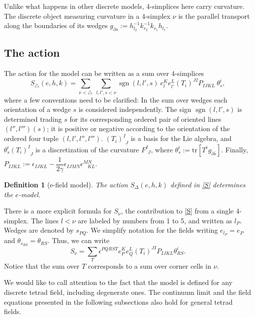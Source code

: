 \documentclass{article}
\newtheorem{definition}{Definition}
\DeclareMathOperator{\sgn}{sgn}
\begin{document}
	Unlike what happens in other discrete models, 4-simplices here carry curvature. The discrete object measuring curvature in a 4-simplex $\nu$ is the parallel transport along the boundaries of its wedges $g_{\partial s}:=h_{l_2}^{-1}k_{r_{2}}^{-1}k_{r_1}h_{l_1}$. 



\subsection{The action}%
\label{action}

The action for the model can be written as a sum over 4-simplices 
\begin{equation}\label{S}
	S_{\triangle}(e,h,k)=
	\sum_{\nu<\triangle} \ \sum_{l, l', s<\nu}
	\sgn(l,l',s) \ e_{l}^{K}e_{l'}^{L}\left(T_{i}\right)^{JI}P_{IJKL} \ \theta_{s}^{i},
\end{equation}	
where a few conventions need to be clarified: 
In the sum over wedges each orientation of a wedge $s$ is considered independently. 
The sign $\sgn(l,l',s)$ is 
determined trading $s$ for its corresponding ordered pair of oriented lines $(l'',l''')(s)$; 
it is positive or negative according to the orientation of the ordered four tuple $(l, l', l'',l''')$.  
$\left(T_{i}\right)_{~~J}^{I}$ is a basis for the Lie algebra, and 
$\theta_{s}^{i} \left(T_{i}\right)_{~~J}^{I}$ is a discretization of the curvature $F_{~~J}^{I}$, where $\theta_{s}^{i}:=\text{tr}\left[T^{i}g_{\partial\bar{s}}\right]$. 
Finally, $P_{IJKL}:=\epsilon_{IJKL}-\dfrac{1}{2\gamma}\epsilon_{IJMN}\epsilon_{~~~~KL}^{MN}$. 

\begin{definition}[e-field model]
	The action $S_{\Delta}(e, h, k)$ defined in \eqref{S} determines the $e$-model. 
\end{definition}


There is a more explicit formula for $S_\nu$, the contribution to \eqref{S} from a single 4-simplex. 
The lines $l<\nu$ are labeled by numbers from 1 to 5, and written as $l_P$. Wedges are denoted by $s_{PQ}$. We simplify notation for the fields writing $e_{l_P}= e_P$ and $\theta_{s_{RS}} = \theta_{RS}$. Thus, we can write 
\begin{equation}\label{dac2}
	S_{\nu}=\sum_{T}\epsilon^{PQRST}e_{P}^{K}e_{Q}^{L}\left(T_{i}\right)^{JI}P_{IJKL}\theta_{RS}^{i}.
\end{equation}	
Notice that the sum over $T$ corresponds to a sum over corner cells in $\nu$. 

We would like to call attention to the fact that the model is defined for any discrete tetrad field, including degenerate ones. The continuum limit and the field equations presented in the following subsections also hold for general tetrad fields. 
\end{document}
